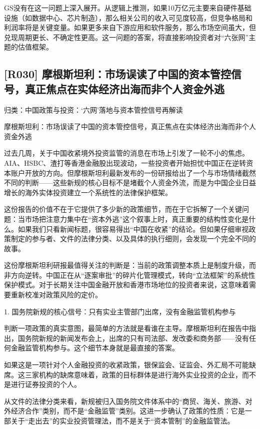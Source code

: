 \documentclass[11pt]{ctexart}
\begin{document}
GS没有在这一问题上深入展开。从逻辑上推测，如果10万亿元主要来自硬件基础设施（如数据中心、芯片制造），那么相关公司的收入可见度较高，但竞争格局和利润率将是关键变量。如果更多来自下游应用和软件服务，那么市场空间虽大，但兑现周期更长、不确定性更高。这一问题的答案，将直接影响投资者对“六张网”主题的估值框架。

\subsection{[R030] 摩根斯坦利：市场误读了中国的资本管控信号，真正焦点在实体经济出海而非个人资金外逃}
{\small\color{refgray}归类：中国政策与投资：‘六网’落地与资本管控信号再解读}

摩根斯坦利：市场误读了中国的资本管控信号，真正焦点在实体经济出海而非个人资金外逃

过去几周，关于中国收紧境外投资监管的消息在市场上引发了一轮不小的焦虑。AIA、HSBC、渣打等香港金融股出现波动，一些投资者开始担忧中国正在逆转资本账户开放的方向。但摩根斯坦利最新发布的一份研报给出了一个与市场情绪截然不同的判断——这些新规的核心目标不是堵截个人资金外流，而是为中国企业日益增长的海外实体投资建立一个系统性的法律保护框架。

这份报告的价值不在于它提供了多少新的政策细节，而在于它拆解了一个关键问题：当市场把注意力集中在“资本外逃”这个叙事上时，真正重要的结构性变化是什么。如果我们只看新闻标题，很容易得出“中国在收紧”的结论。但如果仔细审视政策制定的参与者、文件的法律分类、以及具体的执行细则，会发现一个完全不同的故事。

这份摩根斯坦利研报最值得关注的判断是：当前的政策调整本质上是制度升级，而非方向逆转。中国正在从“逐案审批”的碎片化管理模式，转向“立法框架”的系统性保护模式。对于长期关注中国金融开放和香港市场地位的投资者来说，这意味着需要重新校准对政策风险的定价。

1. 国务院新规的核心信号：只有实业主管部门出席，没有金融监管机构参与

判断一项政策的真实意图，最简单的方法就是看谁在主导。摩根斯坦利在报告中指出，国务院新规的新闻发布会上，出席的只有司法部、发改委和商务部——没有任何金融监管机构参与。这个细节本身就是最直接的答案。

如果这是一项针对个人金融投资的收紧政策，银保监会、证监会、外汇局不可能缺席。这三家机构的缺席意味着，政策的目标群体是进行海外实业投资的企业，而不是进行证券投资的个人。

从文件的法律分类来看，新规被归入国务院文件体系中的“商贸、海关、旅游、对外经济合作”类别，而不是“金融监管”类别。这进一步确认了政策的性质：它是一部关于“走出去”的实业投资管理法，而不是关于“资本管制”的金融监管法。
\end{document}
